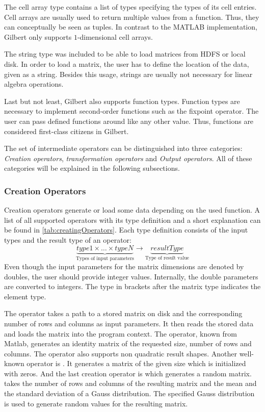 The cell array type contains a list of types specifying the types of its cell entries.
Cell arrays are usually used to return multiple values from a function.
Thus, they can conceptually be seen as tuples.
In contrast to the MATLAB implementation, Gilbert only supports $1$-dimensional cell arrays.

The string type was included to be able to load matrices from HDFS or local disk.
In order to load a matrix, the user has to define the location of the data, given as a string.
Besides this usage, strings are usually not necessary for linear algebra operations.

Last but not least, Gilbert also supports function types.
Function types are necessary to implement second-order functions such as the fixpoint operator.
The user can pass defined functions around like any other value.
Thus, functions are considered first-class citizens in Gilbert.

The set of intermediate operators can be distinguished into three categories: \emph{Creation operators}, \emph{transformation operators} and \emph{Output operators}.
All of these categories will be explained in the following subsections.

\subsubsection{Creation Operators}

Creation operators generate or load some data depending on the used function.
A list of all supported operators with its type definition and a short explanation can be found in \cref{tab:creatingOperators}.
Each type definition consists of the input types and the result type of an operator:
\begin{displaymath}
  \underbrace{type1 \times \ldots \times typeN}_{\text{Types of input parameters}} \rightarrow \underbrace{resultType}_{\text{Type of result value}}
\end{displaymath}
Even though the input parameters for the matrix dimensions are denoted by doubles, the user should provide integer values.
Internally, the double parameters are converted to integers.
The type in brackets after the matrix type indicates the element type.

The  operator takes a path to a stored matrix on disk and the corresponding number of rows and columns as input parameters.
It then reads the stored data and loads the matrix into the program context.
The  operator, known from Matlab, generates an identity matrix of the requested size, number of rows and columns.
The operator also supports non quadratic result shapes.
Another well-known operator is .
It generates a matrix of the given size which is initialized with zeros.
And the last creation operator is  which generates a random matrix.
 takes the number of rows and columns of the resulting matrix and the mean and the standard deviation of a Gauss distribution.
The specified Gauss distribution is used to generate random values for the resulting matrix.

